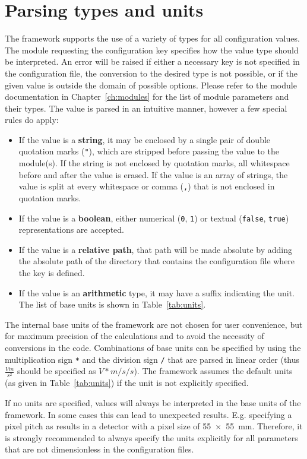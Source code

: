 \section{Parsing types and units}
\label{sec:config_values}
The \corry framework supports the use of a variety of types for all configuration values.
The module requesting the configuration key specifies how the value type should be interpreted.
An error will be raised if either a necessary key is not specified in the configuration file, the conversion to the desired type is not possible, or if the given value is outside the domain of possible options.
Please refer to the module documentation in Chapter~\ref{ch:modules} for the list of module parameters and their types.
The value is parsed in an intuitive manner, however a few special rules do apply:
\begin{itemize}
\item If the value is a \textbf{string}, it may be enclosed by a single pair of double quotation marks (\texttt{"}), which are stripped before passing the value to the module(s).
If the string is not enclosed by quotation marks, all whitespace before and after the value is erased.
If the value is an array of strings, the value is split at every whitespace or comma (\texttt{,}) that is not enclosed in quotation marks.
\item If the value is a \textbf{boolean}, either numerical (\texttt{0}, \texttt{1}) or textual (\texttt{false}, \texttt{true}) representations are accepted.
\item If the value is a \textbf{relative path}, that path will be made absolute by adding the absolute path of the directory that contains the configuration file where the key is defined.
\item If the value is an \textbf{arithmetic} type, it may have a suffix indicating the unit.
The list of base units is shown in Table~\ref{tab:units}.
\end{itemize}

The internal base units of the framework are not chosen for user convenience, but for maximum precision of the calculations and to avoid the necessity of conversions in the code.
Combinations of base units can be specified by using the multiplication sign \texttt{*} and the division sign \texttt{/} that are parsed in linear order (thus $\frac{V m}{s^2}$ should be specified as $V*m/s/s$).
The framework assumes the default units (as given in Table~\ref{tab:units}) if the unit is not explicitly specified.

\begin{warning}
  If no units are specified, values will always be interpreted in the base units of the framework.
  In some cases this can lead to unexpected results.
  E.g. specifying a pixel pitch as  results in a detector with a pixel size of \SI{55 x 55}{\milli \meter}.
  Therefore, it is strongly recommended to always specify the units explicitly for all parameters that are not dimensionless in the configuration files.
\end{warning}

